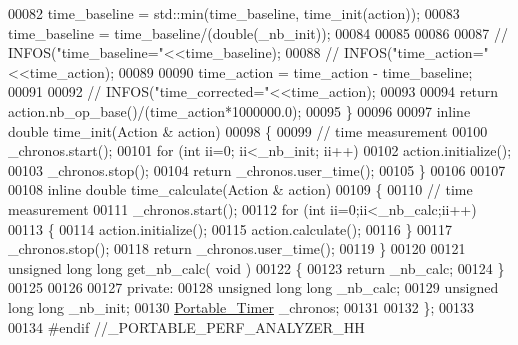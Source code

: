 \begin{DoxyCode}
00082       time\_baseline = std::min(time\_baseline, time\_init(action));
00083     time\_baseline = time\_baseline/(double(\_nb\_init));
00084 
00085 
00086 
00087 \textcolor{comment}{//     INFOS("time\_baseline="<<time\_baseline);}
00088 \textcolor{comment}{//     INFOS("time\_action="<<time\_action);}
00089 
00090     time\_action = time\_action - time\_baseline;
00091 
00092 \textcolor{comment}{//     INFOS("time\_corrected="<<time\_action);}
00093 
00094     \textcolor{keywordflow}{return} action.nb\_op\_base()/(time\_action*1000000.0);
00095   \}
00096 
00097   \textcolor{keyword}{inline} \textcolor{keywordtype}{double} time\_init(Action & action)
00098   \{
00099     \textcolor{comment}{// time measurement}
00100     \_chronos.start();
00101     \textcolor{keywordflow}{for} (\textcolor{keywordtype}{int} ii=0; ii<\_nb\_init; ii++)
00102       action.initialize();
00103     \_chronos.stop();
00104     \textcolor{keywordflow}{return} \_chronos.user\_time();
00105   \}
00106 
00107 
00108   \textcolor{keyword}{inline} \textcolor{keywordtype}{double} time\_calculate(Action & action)
00109   \{
00110     \textcolor{comment}{// time measurement}
00111     \_chronos.start();
00112     \textcolor{keywordflow}{for} (\textcolor{keywordtype}{int} ii=0;ii<\_nb\_calc;ii++)
00113     \{
00114       action.initialize();
00115       action.calculate();
00116     \}
00117     \_chronos.stop();
00118     \textcolor{keywordflow}{return} \_chronos.user\_time();
00119   \}
00120 
00121   \textcolor{keywordtype}{unsigned} \textcolor{keywordtype}{long} \textcolor{keywordtype}{long} get\_nb\_calc( \textcolor{keywordtype}{void} )
00122   \{
00123     \textcolor{keywordflow}{return} \_nb\_calc;
00124   \}
00125 
00126 
00127 \textcolor{keyword}{private}:
00128   \textcolor{keywordtype}{unsigned} \textcolor{keywordtype}{long} \textcolor{keywordtype}{long} \_nb\_calc;
00129   \textcolor{keywordtype}{unsigned} \textcolor{keywordtype}{long} \textcolor{keywordtype}{long} \_nb\_init;
00130   \hyperlink{class_portable___timer}{Portable\_Timer} \_chronos;
00131 
00132 \};
00133 
00134 \textcolor{preprocessor}{#endif //\_PORTABLE\_PERF\_ANALYZER\_HH}
\end{DoxyCode}
